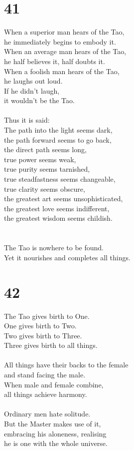 \documentclass[b5paper, 12pt, oneside]{book}
\begin{document}
\chapter*{41}
When a superior man hears of the Tao,\\
he immediately begins to embody it.\\
When an average man hears of the Tao,\\
he half believes it, half doubts it.\\
When a foolish man hears of the Tao,\\
he laughs out loud.\\
If he didn't laugh,\\
it wouldn't be the Tao.\\
\\
Thus it is said:\\
The path into the light seems dark,\\
the path forward seems to go back,\\
the direct path seems long,\\
true power seems weak,\\
true purity seems tarnished,\\
true steadfastness seems changeable,\\
true clarity seems obscure,\\
the greatest art seems unsophisticated,\\
the greatest love seems indifferent,\\
the greatest wisdom seems childish.\\
\\
\\
The Tao is nowhere to be found.\\
Yet it nourishes and completes all things.\\

\chapter*{42}
The Tao gives birth to One.\\
One gives birth to Two.\\
Two gives birth to Three.\\
Three gives birth to all things.\\
\\
All things have their backs to the female\\
and stand facing the male.\\
When male and female combine,\\
all things achieve harmony.\\
\\
Ordinary men hate solitude.\\
But the Master makes use of it,\\
embracing his aloneness, realising\\
he is one with the whole universe.\\
\end{document}
